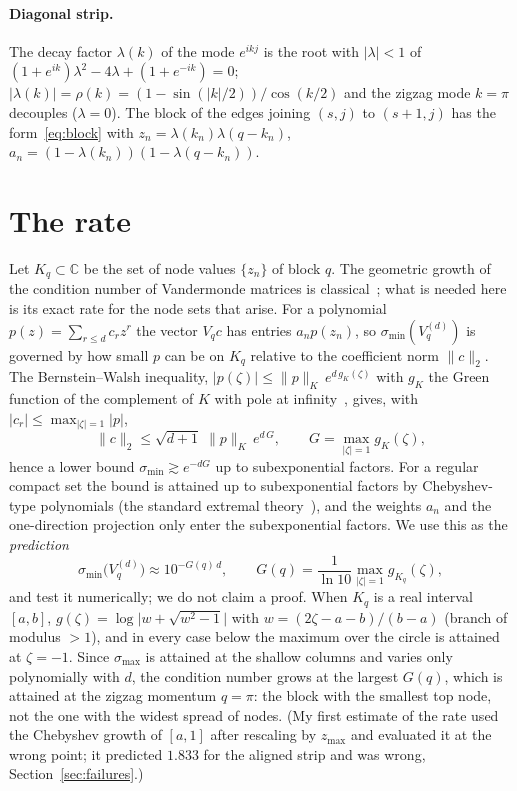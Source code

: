 \documentclass[11pt,a4paper]{article}
\begin{document}
\paragraph{Diagonal strip.} The decay factor $\lambda(k)$ of the mode $e^{ikj}$ is the root with $|\lambda|<1$ of
$(1+e^{ik})\lambda^2-4\lambda+(1+e^{-ik})=0$; $|\lambda(k)|=\rho(k)=(1-\sin(|k|/2))/\cos(k/2)$ and the zigzag mode $k=\pi$
decouples ($\lambda=0$). The block of the edges joining $(s,j)$ to $(s+1,j)$ has the form~\eqref{eq:block} with
$z_n=\lambda(k_n)\lambda(q-k_n)$, $a_n=(1-\lambda(k_n))(1-\lambda(q-k_n))$.

\section{The rate}\label{sec:rate}
Let $K_q\subset\mathbb C$ be the set of node values $\{z_n\}$ of block $q$. The geometric growth of the condition number of
Vandermonde matrices is classical~\cite{Gautschi62,Gautschi75}; what is needed here is its exact rate for the node sets that
arise. For a polynomial $p(z)=\sum_{r\le d}c_rz^r$ the
vector $V_qc$ has entries $a_np(z_n)$, so $\sigma_{\min}(V_q^{(d)})$ is governed by how small $p$ can be on $K_q$ relative to the
coefficient norm $\|c\|_2$. The Bernstein--Walsh inequality, $|p(\zeta)|\le\|p\|_{K}\,e^{d\,g_K(\zeta)}$ with $g_K$ the Green function
of the complement of $K$ with pole at infinity~\cite{Ransford,SaffTotik}, gives, with $|c_r|\le\max_{|\zeta|=1}|p|$,
\[
\|c\|_2\le\sqrt{d+1}\;\|p\|_{K}\,e^{d\,G},\qquad G=\max_{|\zeta|=1}g_K(\zeta),
\]
hence a lower bound $\sigma_{\min}\gtrsim e^{-dG}$ up to subexponential factors. For a regular compact set the bound is
attained up to subexponential factors by Chebyshev-type polynomials (the standard extremal theory~\cite{SaffTotik}), and the
weights $a_n$ and the one-direction projection only enter the subexponential factors. We use this as the \emph{prediction}
\begin{equation}
\sigma_{\min}\bigl(V_q^{(d)}\bigr)\approx 10^{-G(q)\,d},\qquad G(q)=\frac{1}{\ln 10}\max_{|\zeta|=1}g_{K_q}(\zeta),
\label{eq:rate}
\end{equation}
and test it numerically; we do not claim a proof. When $K_q$ is a real interval $[a,b]$,
$g(\zeta)=\log\bigl|w+\sqrt{w^2-1}\bigr|$ with $w=(2\zeta-a-b)/(b-a)$ (branch of modulus $>1$), and in every case below the
maximum over the circle is attained at $\zeta=-1$. Since $\sigma_{\max}$ is attained at the shallow columns and varies
only polynomially with $d$, the condition number grows at the largest $G(q)$, which is attained at the zigzag momentum $q=\pi$:
the block with the smallest top node, not the one with the widest spread of nodes. (My first estimate of the rate used the
Chebyshev growth of $[a,1]$ after rescaling by $z_{\max}$ and evaluated it at the wrong point; it predicted $1.833$ for the
aligned strip and was wrong, Section~\ref{sec:failures}.)
\end{document}

